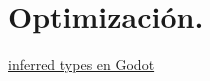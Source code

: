 
\section{Optimización.}\label{optimizacion:optimizacion}

\href{https://docs.godotengine.org/en/stable/getting_started/scripting/gdscript/gdscript_styleguide.html#inferred-types}{inferred types en Godot}